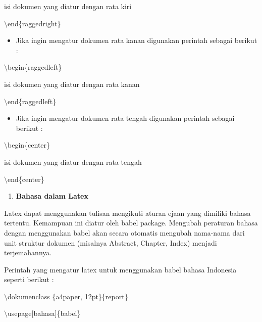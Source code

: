 \hspace{0,5in}isi dokumen yang diatur dengan rata kiri

\hspace{0,5in}$\setminus$end\{raggedright\}

\begin{itemize}
\item Jika ingin mengatur dokumen rata kanan digunakan perintah sebagai berikut :
\end{itemize}
\hspace{0,5in}$\setminus$begin\{raggedleft\}

\hspace{0,5in}isi dokumen yang diatur dengan rata kanan

\hspace{0,5in}$\setminus$end\{raggedleft\}

\begin{itemize}
\item Jika ingin mengatur dokumen rata tengah digunakan perintah sebagai berikut :
\end{itemize}
\hspace{0,5in}$\setminus$begin\{center\}

\hspace{0,5in}isi dokumen yang diatur dengan rata tengah

\hspace{0,5in}$\setminus$end\{center\}

\begin{enumerate}
\setcounter{enumi}{\thenumberedCntB}
\item \textbf{Bahasa dalam Latex}
\setcounter{numberedCntB}{\theenumi}
\end{enumerate}
\hspace{0,5in}Latex dapat menggunakan tulisan mengikuti aturan ejaan yang dimiliki bahasa tertentu. Kemampuan ini diatur oleh babel package. Mengubah peraturan bahasa dengan menggunakan babel akan secara otomatis mengubah nama-nama dari unit struktur dokumen (misalnya Abstract, Chapter, Index) 
menjadi terjemahannya.\par \vspace{12pt}

Perintah yang mengatur latex untuk menggunakan babel bahasa Indonesia seperti berikut :

$\setminus$dokumenclass \{a4paper, 12pt\}\{report\}\par \vspace{12pt}

$\setminus$usepage$[$bahasa$]$\{babel\}\par \vspace{12pt}

